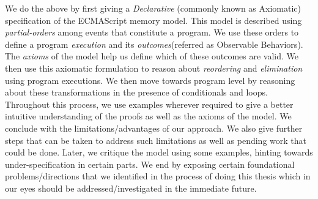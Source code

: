We do the above by first giving a \textit{Declarative} (commonly known as Axiomatic) specification of the ECMAScript memory model. 
This model is described using \textit{partial-orders} among events that constitute a program.
We use these orders to define a program \textit{execution} and its \textit{outcomes}(referred as Observable Behaviors).
The \textit{axioms} of the model help us define which of these outcomes are valid.
We then use this axiomatic formulation to reason about \textit{reordering} and \textit{elimination} using program executions.
We then move towards program level by reasoning about these transformations in the presence of conditionals and loops. 
Throughout this process, we use examples wherever required to give a better intuitive understanding of the proofs as well as the axioms of the model. 
We conclude with the limitations/advantages of our approach.
We also give further steps that can be taken to address such limitations as well as pending work that could be done.
Later, we critique the model using some examples, hinting towards under-specification in certain parts.
We end by exposing certain foundational problems/directions that we identified in the process of doing this thesis which in our eyes should be addressed/investigated in the immediate future.

